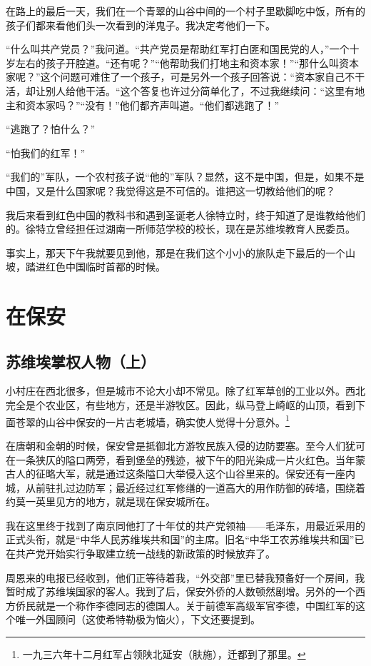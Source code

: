 \documentclass[10pt]{book}
\begin{document}
在路上的最后一天，我们在一个青翠的山谷中间的一个村子里歇脚吃中饭，所有的孩子们都来看他们头一次看到的洋鬼子。我决定考他们一下。

“什么叫共产党员？”我问道。“共产党员是帮助红军打白匪和国民党的人，”一个十岁左右的孩子开腔道。“还有呢？”“他帮助我们打地主和资本家！”“那什么叫资本家呢？”这个问题可难住了一个孩子，可是另外一个孩子回答说：“资本家自己不干活，却让别人给他干活。“这个答复也许过分简单化了，不过我继续问：“这里有地主和资本家吗？”“没有！”他们都齐声叫道。“他们都逃跑了！”

“逃跑了？怕什么？”

“怕我们的红军！”

“我们的”军队，一个农村孩子说“他的”军队？显然，这不是中国，但是，如果不是中国，又是什么国家呢？我觉得这是不可信的。谁把这一切教给他们的呢？

我后来看到红色中国的教科书和遇到圣诞老人徐特立时，终于知道了是谁教给他们的。徐特立曾经担任过湖南一所师范学校的校长，现在是苏维埃教育人民委员。

事实上，那天下午我就要见到他，那是在我们这个小小的旅队走下最后的一个山坡，踏进红色中国临时首都的时候。



\chapter{在保安}

\section{苏维埃掌权人物（上）}

小村庄在西北很多，但是城市不论大小却不常见。除了红军草创的工业以外。西北完全是个农业区，有些地方，还是半游牧区。因此，纵马登上崎岖的山顶，看到下面苍翠的山谷中保安的一片古老城墙，确实使人觉得十分意外。\footnote{一九三六年十二月红军占领陕北延安（肤施），迁都到了那里。}

在唐朝和金朝的时候，保安曾是抵御北方游牧民族入侵的边防要塞。至今人们犹可在一条狭仄的隘口两旁，看到堡垒的残迹，被下午的阳光染成一片火红色。当年蒙古人的征略大军，就是通过这条隘口大举侵入这个山谷里来的。保安还有一座内城，从前驻扎过边防军；最近经过红军修缮的一道高大的用作防御的砖墙，围绕着约莫一英里见方的地方，就是现在保安城所在。

我在这里终于找到了南京同他打了十年仗的共产党领袖——毛泽东，用最近采用的正式头衔，就是“中华人民苏维埃共和国”的主席。旧名“中华工农苏维埃共和国”已在共产党开始实行争取建立统一战线的新政策的时候放弃了。

周恩来的电报已经收到，他们正等待着我，“外交部”里已替我预备好一个房间，我暂时成了苏维埃国家的客人。我到了后，保安外侨的人数顿然剧增。另外的一个西方侨民就是一个称作李德同志的德国人。关于前德军高级军官李德，中国红军的这个唯一外国顾问（这使希特勒极为恼火），下文还要提到。
\end{document}
